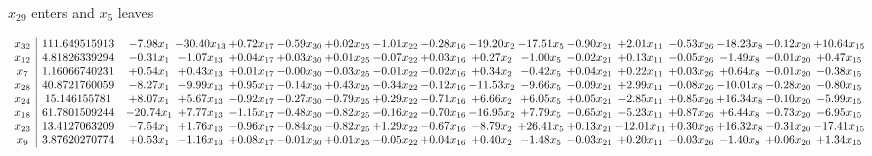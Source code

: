 \documentclass[9pt]{article}
\begin{document}
 $ x_{29} $ enters and $ x_{5} $ leaves 

 \[\begin{array}{c| c c@{\hskip 2pt} c@{\hskip 2pt} c@{\hskip 2pt} c@{\hskip 2pt} c@{\hskip 2pt} c@{\hskip 2pt} c@{\hskip 2pt} c@{\hskip 2pt} c@{\hskip 2pt} c@{\hskip 2pt} c@{\hskip 2pt} c@{\hskip 2pt} c@{\hskip 2pt} c@{\hskip 2pt} c@{\hskip 2pt} }
 x_{32}   &  111.649515913 & -7.98 x_{1} & -30.40 x_{13} & +  0.72 x_{17} & -0.59 x_{30} & +  0.02 x_{25} & -1.01 x_{22} & -0.28 x_{16} & -19.20 x_{2} & -17.51 x_{5} & -0.90 x_{21} & +  2.01 x_{11} & -0.53 x_{26} & -18.23 x_{8} & -0.12 x_{20} & + 10.64 x_{15}\\
 x_{12}   &  4.81826339294 & -0.31 x_{1} & -1.07 x_{13} & +  0.04 x_{17} & +  0.03 x_{30} & +  0.01 x_{25} & -0.07 x_{22} & +  0.03 x_{16} & +  0.27 x_{2} & -1.00 x_{5} & -0.02 x_{21} & +  0.13 x_{11} & -0.05 x_{26} & -1.49 x_{8} & -0.01 x_{20} & +  0.47 x_{15}\\
 x_{7}   &  1.16066740231 & +  0.54 x_{1} & +  0.43 x_{13} & +  0.01 x_{17} & -0.00 x_{30} & -0.03 x_{25} & -0.01 x_{22} & -0.02 x_{16} & +  0.34 x_{2} & -0.42 x_{5} & +  0.04 x_{21} & +  0.22 x_{11} & +  0.03 x_{26} & +  0.64 x_{8} & -0.01 x_{20} & -0.38 x_{15}\\
 x_{28}   &  40.8721760059 & -8.27 x_{1} & -9.99 x_{13} & +  0.95 x_{17} & -0.14 x_{30} & +  0.43 x_{25} & -0.34 x_{22} & -0.12 x_{16} & -11.53 x_{2} & -9.66 x_{5} & -0.09 x_{21} & +  2.99 x_{11} & -0.08 x_{26} & -10.01 x_{8} & -0.28 x_{20} & -0.80 x_{15}\\
 x_{24}   &  15.146155781 & +  8.07 x_{1} & +  5.67 x_{13} & -0.92 x_{17} & -0.27 x_{30} & -0.79 x_{25} & +  0.29 x_{22} & -0.71 x_{16} & +  6.66 x_{2} & +  6.05 x_{5} & +  0.05 x_{21} & -2.85 x_{11} & +  0.85 x_{26} & + 16.34 x_{8} & -0.10 x_{20} & -5.99 x_{15}\\
 x_{18}   &  61.7801509244 & -20.74 x_{1} & +  7.77 x_{13} & -1.15 x_{17} & -0.48 x_{30} & -0.82 x_{25} & -0.16 x_{22} & -0.70 x_{16} & -16.95 x_{2} & +  7.79 x_{5} & -0.65 x_{21} & -5.23 x_{11} & +  0.87 x_{26} & +  6.44 x_{8} & -0.73 x_{20} & -6.95 x_{15}\\
 x_{23}   &  13.4127063209 & -7.54 x_{1} & +  1.76 x_{13} & -0.96 x_{17} & -0.84 x_{30} & -0.82 x_{25} & +  1.29 x_{22} & -0.67 x_{16} & -8.79 x_{2} & + 26.41 x_{5} & +  0.13 x_{21} & -12.01 x_{11} & +  0.30 x_{26} & + 16.32 x_{8} & -0.31 x_{20} & -17.41 x_{15}\\
 x_{9}   &  3.87620270774 & +  0.53 x_{1} & -1.16 x_{13} & +  0.08 x_{17} & -0.01 x_{30} & +  0.01 x_{25} & -0.05 x_{22} & +  0.04 x_{16} & +  0.40 x_{2} & -1.48 x_{5} & -0.03 x_{21} & +  0.20 x_{11} & -0.03 x_{26} & -1.40 x_{8} & +  0.06 x_{20} & +  1.34 x_{15}\\

\end{array}\]
\end{document}
